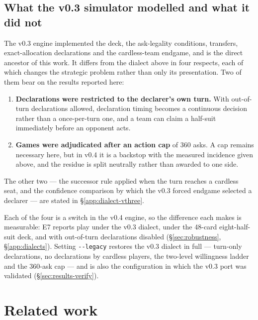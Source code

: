 \documentclass[11pt]{article}
\theoremstyle{definition}
\begin{document}
\subsection{What the v0.3 simulator modelled and what it did not}
\label{sec:rules-v03}

The v0.3 engine \cite{fishbot03} implemented the deck, the ask-legality
conditions, transfers, exact-allocation declarations and the cardless-team
endgame, and is the direct ancestor of this work. It differs from the dialect
above in four respects, each of which changes the strategic problem rather than
only its presentation. Two of them bear on the results reported here:

\begin{enumerate}
  \item \textbf{Declarations were restricted to the declarer's own turn.} With
        out-of-turn declarations allowed, declaration timing becomes a
        continuous decision rather than a once-per-turn one, and a team can
        claim a half-suit immediately before an opponent acts.
  \item \textbf{Games were adjudicated after an action cap} of 360 asks. A cap
        remains necessary here, but in v0.4 it is a backstop with the measured
        incidence given above, and the residue is split neutrally rather than
        awarded to one side.
\end{enumerate}

The other two --- the successor rule applied when the turn reaches a cardless
seat, and the confidence comparison by which the v0.3 forced endgame selected a
declarer --- are stated in \S\ref{app:dialect-vthree}.

Each of the four is a switch in the v0.4 engine, so the difference each makes is
measurable: E7 reports play under the v0.3 dialect, under the 48-card
eight-half-suit deck, and with out-of-turn declarations disabled
(\S\ref{sec:robustness}, \S\ref{app:dialects}). Setting \texttt{-{}-legacy}
restores the v0.3 dialect in full --- turn-only declarations, no declarations by
cardless players, the two-level willingness ladder and the 360-ask cap --- and
is also the configuration in which the v0.3 port was validated
(\S\ref{sec:results-verify}).
\section{Related work}
\label{sec:related}
\end{document}
